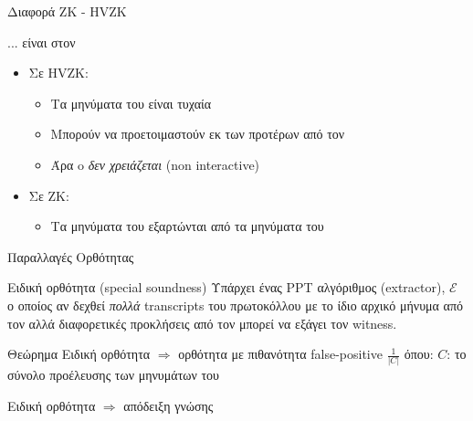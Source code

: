 \documentclass[handout]{beamer}
\begin{document}
\begin{frame}{Διαφορά ZK - HVZK}
    \begin{block}{... είναι στον \ver}
    \begin{itemize}
        \item Σε HVZK:
        \begin{itemize}
            \item Τα μηνύματα του \ver είναι τυχαία 
            \item Μπορούν να προετοιμαστούν εκ των προτέρων  από τον \siml
            \item Άρα o \ver \emph{δεν χρειάζεται} (non interactive)
        \end{itemize} 
        \item Σε ZK:
        \begin{itemize}
            \item Τα μηνύματα του \ver εξαρτώνται από τα μηνύματα του \prv
        \end{itemize}
    \end{itemize}    
    \end{block}
\end{frame}

\begin{frame}{Παραλλαγές Ορθότητας}
\begin{block}{Ειδική ορθότητα (special soundness)}
Υπάρχει ένας PPT αλγόριθμος (extractor), $\mathcal{E}$ ο οποίος αν δεχθεί \emph{πολλά} transcripts του πρωτοκόλλου με το ίδιο αρχικό μήνυμα από τον \prv αλλά διαφορετικές προκλήσεις από τον \ver μπορεί να εξάγει τον witness.
\end{block}
\pause
\begin{block}{Θεώρημα}
Ειδική ορθότητα $\Rightarrow$ ορθότητα με πιθανότητα false-positive $\frac{1}{|C|}$ όπου:
$C$: το σύνολο προέλευσης των μηνυμάτων του \ver

Ειδική ορθότητα $\Rightarrow$ απόδειξη γνώσης
\end{block}
\end{frame}
\end{document}

